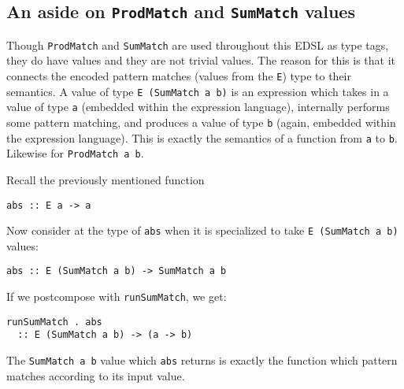 \documentclass[sigplan,anonymous,review]{acmart}
\newcommand{\ttt}{\texttt}
\newenvironment{todo}
  {\begin{tcolorbox}
   \textbf{TODO}:
  }
  {\end{tcolorbox}
  }
\begin{document}



\subsection{An aside on \ttt{ProdMatch} and \ttt{SumMatch} values}

Though \ttt{ProdMatch} and \ttt{SumMatch} are used throughout this EDSL as type
tags, they do have values and they are not trivial values. The reason for this
is that it connects the encoded pattern matches (values from the \ttt{E}) type
to their semantics. A value of type \ttt{E (SumMatch a b)} is an expression
which takes in a value of type \ttt{a} (embedded within the expression
language), internally performs some pattern matching, and produces a value of
type \ttt{b} (again, embedded within the expression language). This is exactly
the semantics of a function from \ttt{a} to \ttt{b}. Likewise for \ttt{ProdMatch a b}.

Recall the previously mentioned function

\begin{lstlisting}
abs :: E a -> a
\end{lstlisting}

Now consider at the type of \ttt{abs} when it is specialized to take
\ttt{E (SumMatch a b)} values:

\begin{lstlisting}
abs :: E (SumMatch a b) -> SumMatch a b
\end{lstlisting}

If we postcompose with \ttt{runSumMatch}, we get:

\begin{lstlisting}
runSumMatch . abs
  :: E (SumMatch a b) -> (a -> b)
\end{lstlisting}

The \ttt{SumMatch a b} value which \ttt{abs} returns is exactly the function
which pattern matches according to its input value.
\end{document}
